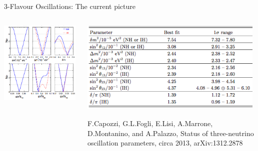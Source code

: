 \begin{frame}{3-Flavour Oscillations: The current picture}

\begin{columns}[T]
  \begin{column}{0.55\textwidth}
    \begin{center}
     \includegraphics[width=0.98\textwidth]{./images/3nu/global_fits/fl-chisq.png}\\
    \end{center}
  \end{column}
  \begin{column}{0.45\textwidth}
    \begin{center}
     \includegraphics[width=0.98\textwidth]{./images/3nu/global_fits/fl-table.png}\\
    \end{center}
    {\tiny
      F.Capozzi, G.L.Fogli, E.Lisi, A.Marrone, D.Montanino, and A.Palazzo, Status of three-neutrino oscillation
      parameters, circa 2013, arXiv:1312.2878\\
    }
  \end{column}
\end{columns}
\end{frame}



